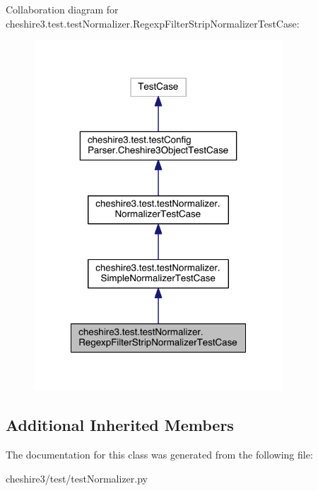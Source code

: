 Collaboration diagram for cheshire3.\-test.\-test\-Normalizer.\-Regexp\-Filter\-Strip\-Normalizer\-Test\-Case\-:
\nopagebreak
\begin{figure}[H]
\begin{center}
\leavevmode
\includegraphics[width=264pt]{classcheshire3_1_1test_1_1test_normalizer_1_1_regexp_filter_strip_normalizer_test_case__coll__graph}
\end{center}
\end{figure}
\subsection*{Additional Inherited Members}


The documentation for this class was generated from the following file\-:\begin{DoxyCompactItemize}
\item 
cheshire3/test/test\-Normalizer.\-py\end{DoxyCompactItemize}
